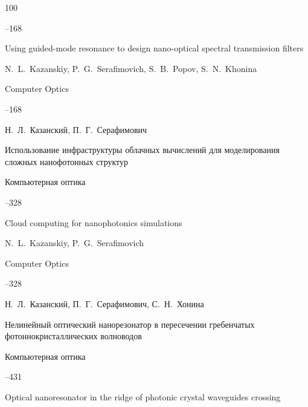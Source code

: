 \begin{thebibliography}{100}


--168

\misctransl

\paper Using guided-mode resonance to design nano-optical spectral transmission filters

\by N.~L.~Kazanskiy, P.~G.~Serafimovich, S.~B.~Popov, S.~N.~Khonina 

\jour Computer Optics




--168




\by Н.~Л.~Казанский, П.~Г.~Серафимович

\paper Использование инфраструктуры облачных вычислений для моделирования сложных нанофотонных структур 

\jour Компьютерная оптика




--328

\misctransl

\paper Cloud computing for nanophotonics simulations

\by N.~L.~Kazanskiy, P.~G.~Serafimovich 

\jour Computer Optics




--328






\by Н.~Л.~Казанский, П.~Г.~Серафимович, С.~Н.~Хонина

\paper Нелинейный оптический нанорезонатор в пересечении гребенчатых фотоннокристаллических волноводов

\jour Компьютерная оптика




--431

\misctransl

\paper Optical nanoresonator in the ridge of photonic crystal waveguides crossing


\end{thebibliography}
